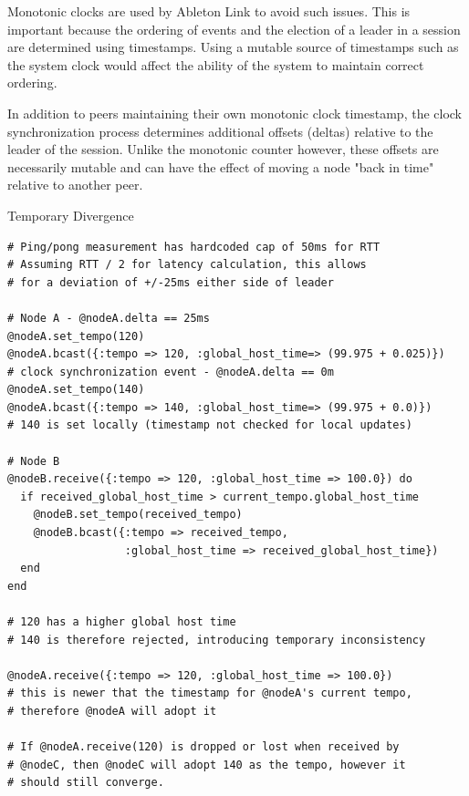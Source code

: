 \documentclass[11pt]{article} %
\theoremstyle{plain}
\theoremstyle{definition}
\begin{document}
Monotonic clocks are used by Ableton Link\cite{goltz2018ableton} to avoid such
issues. This is important because the ordering of events and the election of a
leader in a session are determined using timestamps. Using a mutable source of
timestamps such as the system clock would affect the ability of the system to
maintain correct ordering.

In addition to peers maintaining their own monotonic clock timestamp, the clock
synchronization process determines additional offsets (deltas) relative to the
leader of the session. Unlike the monotonic counter however, these offsets are
necessarily mutable and can have the effect of moving a node "back in time"
relative to another peer.

\begin{algorithm}
  \caption{Temporary Divergence}\label{linkdivergence}
\begin{algorithmic}[1]
\item{ }
\end{algorithmic}
\end{algorithm}

\begin{verbatim}
# Ping/pong measurement has hardcoded cap of 50ms for RTT
# Assuming RTT / 2 for latency calculation, this allows
# for a deviation of +/-25ms either side of leader

# Node A - @nodeA.delta == 25ms
@nodeA.set_tempo(120)
@nodeA.bcast({:tempo => 120, :global_host_time=> (99.975 + 0.025)})
# clock synchronization event - @nodeA.delta == 0m
@nodeA.set_tempo(140)
@nodeA.bcast({:tempo => 140, :global_host_time=> (99.975 + 0.0)})
# 140 is set locally (timestamp not checked for local updates)

# Node B
@nodeB.receive({:tempo => 120, :global_host_time => 100.0}) do
  if received_global_host_time > current_tempo.global_host_time
    @nodeB.set_tempo(received_tempo)
    @nodeB.bcast({:tempo => received_tempo,
                  :global_host_time => received_global_host_time})
  end
end

# 120 has a higher global host time
# 140 is therefore rejected, introducing temporary inconsistency

@nodeA.receive({:tempo => 120, :global_host_time => 100.0})
# this is newer that the timestamp for @nodeA's current tempo,
# therefore @nodeA will adopt it

# If @nodeA.receive(120) is dropped or lost when received by
# @nodeC, then @nodeC will adopt 140 as the tempo, however it
# should still converge.
\end{verbatim}
\end{document}

